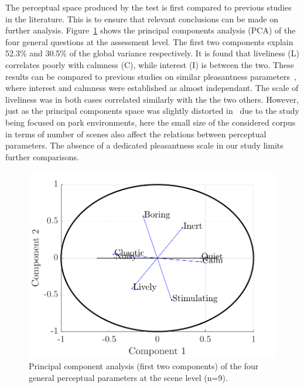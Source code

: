 \documentclass{article}
\begin{document}
\begin{sloppy}
The perceptual space produced by the test is first compared to previous studies in the literature. This is to ensure that relevant conclusions can be made on further analysis. Figure~\ref{fig:pca} shows the principal components analysis (PCA) of the four general questions at the assessment level. The first two components explain 52.3\% and 30.5\% of the global variance respectively. It is found that liveliness (L) correlates poorly with calmness (C), while interest (I) is between the two. These results can be compared to previous studies on similar pleasantness parameters~\cite{axelsson2010, cain2013, jeon2018}, where interest and calmness were established as almost independant. The scale of liveliness was in both cases correlated similarly with the the two others. However, just as the principal components space was slightly distorted in~\cite{jeon2018} due to the study being focused on park environments, here the small size of the considered corpus in terms of number of scenes also affect the relations between perceptual parameters. The absence of a dedicated pleasantness scale in our study limits further comparisons.

\begin{figure}[t]
  \centering
  \centerline{\includegraphics[width=\columnwidth]{pca.pdf}}
  \caption{Principal component analysis (first two components) of the four general perceptual parameters at the scene level (n=9). }
  \label{fig:pca}
\end{figure}


\end{sloppy}
\end{document}
